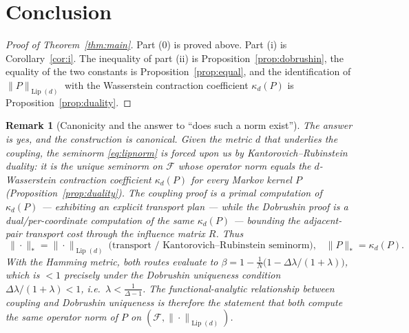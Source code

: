 \documentclass{amsart}
\newtheorem{remark}{Remark}
\DeclareMathOperator{\Lip}{Lip}
\begin{document}
\section{Conclusion}

\begin{proof}[Proof of Theorem~\ref{thm:main}]
Part (0) is proved above. Part (i) is Corollary~\ref{cor:i}. The inequality of
part (ii) is Proposition~\ref{prop:dobrushin}, the equality of the two constants
is Proposition~\ref{prop:equal}, and the identification of $\|P\|_{\Lip(d)}$ with
the Wasserstein contraction coefficient $\kappa_d(P)$ is
Proposition~\ref{prop:duality}.
\end{proof}

\begin{remark}[Canonicity and the answer to ``does such a norm exist''] The
answer is \emph{yes}, and the construction is canonical. Given the metric $d$
that underlies the coupling, the seminorm \eqref{eq:lipnorm} is forced upon us by
Kantorovich--Rubinstein duality: it is the unique seminorm on $\mathcal F$ whose
operator norm equals the $d$-Wasserstein contraction coefficient
$\kappa_d(P)$ for \emph{every} Markov kernel $P$
(Proposition~\ref{prop:duality}). The coupling proof is a primal computation of
$\kappa_d(P)$ — exhibiting an explicit transport plan — while the Dobrushin proof
is a dual/per-coordinate computation of the same $\kappa_d(P)$ — bounding the
adjacent-pair transport cost through the influence matrix $R$. Thus
\[
\boxed{\ \|\cdot\|_{*}=\|\cdot\|_{\Lip(d)}\ \text{(transport / Kantorovich--Rubinstein seminorm),}\quad
\|P\|_{*}=\kappa_d(P).\ }
\]
With the Hamming metric, both routes evaluate to
$\beta=1-\tfrac1N\big(1-\Delta\lambda/(1+\lambda)\big)$, which is $<1$ precisely
under the Dobrushin uniqueness condition $\Delta\lambda/(1+\lambda)<1$, i.e.\
$\lambda<\tfrac1{\Delta-1}$. The functional-analytic relationship between coupling
and Dobrushin uniqueness is therefore the statement that both compute the same
operator norm of $P$ on $(\mathcal F,\|\cdot\|_{\Lip(d)})$.
\end{remark}
\end{document}
